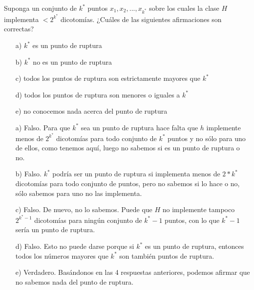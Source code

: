 \documentclass[12pt]{article}
\theoremstyle{definition}
\begin{document}
\begin{pregunta}
Suponga un conjunto de $k^*$ puntos $x_1,x_2,...,x_{k^*}$ sobre los cuales la clase $H$ implementa $<2^{k^*}$ dicotomías. ¿Cuáles de las siguientes afirmaciones son correctas?
\begin{enumerate}
\item[a)] $k^*$ es un punto de ruptura
\item[b)] $k^*$ no es un punto de ruptura
\item[c)] todos los puntos de ruptura son estrictamente mayores que $k^*$
\item[d)] todos los puntos de ruptura son menores o iguales a $k^*$
\item[e)] no conocemos nada acerca del punto de ruptura
\end{enumerate}

\begin{enumerate}
\item[a)] Falso. Para que $k^*$ sea un punto de ruptura hace falta que $h$ implemente menos de $2^{k^*}$ dicotomías para todo conjunto de $k^*$ puntos y no sólo para uno de ellos, como tenemos aquí, luego no sabemos si es un punto de ruptura o no.
\item[b)] Falso. $k^*$ podría ser un punto de ruptura si implementa menos de $2*{k^*}$ dicotomías para todo conjunto de puntos, pero no sabemos si lo hace o no, sólo sabemos para uno no las implementa.
\item[c)] Falso. De nuevo, no lo sabemos. Puede que $H$ no implemente tampoco $2^{k^*-1}$ dicotomías para ningún conjunto de $k^*-1$ puntos, con lo que $k^*-1$ sería un punto de ruptura.
\item[d)] Falso. Esto no puede darse porque si $k^*$ es un punto de ruptura, entonces todos los números mayores que $k^*$ son también puntos de ruptura.
\item[e)] Verdadero. Basándonos en las 4 respuestas anteriores, podemos afirmar que no sabemos nada del punto de ruptura. 
\end{enumerate}
\end{pregunta}
\end{document}
